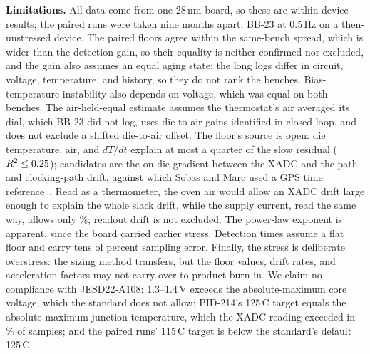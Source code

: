 \documentclass[10pt,twocolumn]{article}
\newcommand{\degC}{\,\textdegree C}
\begin{document}
\textbf{Limitations.} All data come from one 28\,nm board, so these are within-device results; the paired runs were taken nine months apart, BB-23 at 0.5\,Hz on a then-unstressed device. The paired floors agree within the same-bench spread, which is wider than the detection gain, so their equality is neither confirmed nor excluded, and the gain also assumes an equal aging state; the long logs differ in circuit, voltage, temperature, and history, so they do not rank the benches. Bias-temperature instability also depends on voltage, which was equal on both benches. The air-held-equal estimate assumes the thermostat's air averaged its dial, which BB-23 did not log, uses die-to-air gains identified in closed loop, and does not exclude a shifted die-to-air offset. The floor's source is open: die temperature, air, and $dT/dt$ explain at most a quarter of the slow residual ($R^2\le0.25$); candidates are the on-die gradient between the XADC and the path and clocking-path drift, against which Sobas and Marc used a GPS time reference~\cite{sobas}. Read as a thermometer, the oven air would allow an XADC drift large enough to explain the whole slack drift, while the supply current, read the same way, allows only \vThermoShare\%; readout drift is not excluded. The power-law exponent is apparent, since the board carried earlier stress. Detection times assume a flat floor and carry tens of percent sampling error. Finally, the stress is deliberate overstress: the sizing method transfers, but the floor values, drift rates, and acceleration factors may not carry over to product burn-in. We claim no compliance with JESD22-A108: 1.3--1.4\,V exceeds the absolute-maximum core voltage, which the standard does not allow; PID-214's 125\degC{} target equals the absolute-maximum junction temperature, which the XADC reading exceeded in \vTjAbovePct\% of samples; and the paired runs' 115\degC{} target is below the standard's default 125\degC~\cite{jedec}.

\end{document}
